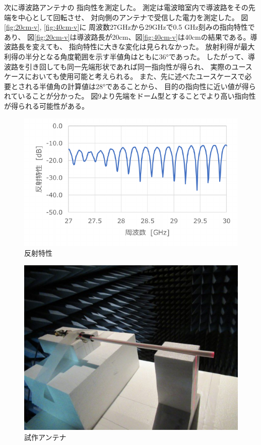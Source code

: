 \documentclass[technicalreport]{ieicej}
\begin{document}
次に導波路アンテナの
指向性を測定した。
測定は電波暗室内で導波路をその先端を中心として回転させ、
対向側のアンテナで受信した電力を測定した。
図\ref{fig:20cm-v}, \ref{fig:40cm-v}に
周波数27GHzから29GHzで0.5 GHz刻みの指向特性であり、
図\ref{fig:20cm-v}は導波路長が20cm、図\ref{fig:40cm-v}は40cmの結果である。導波路長を変えても、
指向特性に大きな変化は見られなかった。
放射利得が最大利得の半分となる角度範囲を示す半値角はともに36°であった。
したがって、導波路を引き回しても同一先端形状であれば同一指向性が得られ、
実際のユースケースにおいても使用可能と考えられる。
また、先に述べたユースケースで必要とされる半値角の計算値は28°であることから、
目的の指向性に近い値が得られていることが分かった。
図9より先端をドーム型とすることでより高い指向性が得られる可能性がある。

\begin{figure}[tb]
  \begin{center}
    \includegraphics[bb=0.000000 0.000000 312.875761 187.419999, width=0.9\linewidth]{img/reflection_params.pdf}
    \caption{反射特性}
    \label{fig:reflection_params}
  \end{center}
\end{figure}

\begin{figure}[tb]
  \begin{center}
    \includegraphics[bb=0.000000 0.000000 522.000000 402.750000, width=0.9\linewidth]{img/docomo_antenna.pdf}
    \caption{試作アンテナ}
    \label{fig:docomo_antenna}
  \end{center}
\end{figure}
\end{document}
